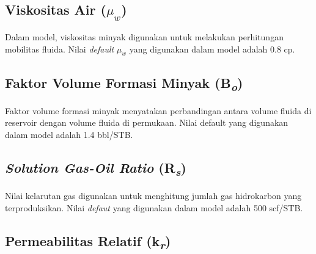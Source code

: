 \documentclass[
]{book}
\begin{document}
\hypertarget{viskositas-air-mu_w}{%
\subsection{\texorpdfstring{Viskositas Air (\(\mu_w\))}{Viskositas Air (\textbackslash mu\_w)}}\label{viskositas-air-mu_w}}

Dalam model, viskositas minyak digunakan untuk melakukan perhitungan mobilitas fluida. Nilai \emph{default} \(\mu_w\) yang digunakan dalam model adalah 0.8 cp.

\hypertarget{faktor-volume-formasi-minyak-bo}{%
\subsection{\texorpdfstring{Faktor Volume Formasi Minyak (B\textsubscript{\emph{o}})}{Faktor Volume Formasi Minyak (Bo)}}\label{faktor-volume-formasi-minyak-bo}}

Faktor volume formasi minyak menyatakan perbandingan antara volume fluida di reservoir dengan volume fluida di permukaan. Nilai default yang digunakan dalam model adalah 1.4 bbl/STB.

\hypertarget{solution-gas-oil-ratio-rs}{%
\subsection{\texorpdfstring{\emph{Solution Gas-Oil Ratio} (R\textsubscript{\emph{s}})}{Solution Gas-Oil Ratio (Rs)}}\label{solution-gas-oil-ratio-rs}}

Nilai kelarutan gas digunakan untuk menghitung jumlah gas hidrokarbon yang terproduksikan. Nilai \emph{defaut} yang digunakan dalam model adalah 500 scf/STB.

\hypertarget{permeabilitas-relatif-kr}{%
\subsection{\texorpdfstring{Permeabilitas Relatif (k\textsubscript{\emph{r}})}{Permeabilitas Relatif (kr)}}\label{permeabilitas-relatif-kr}}
\end{document}
